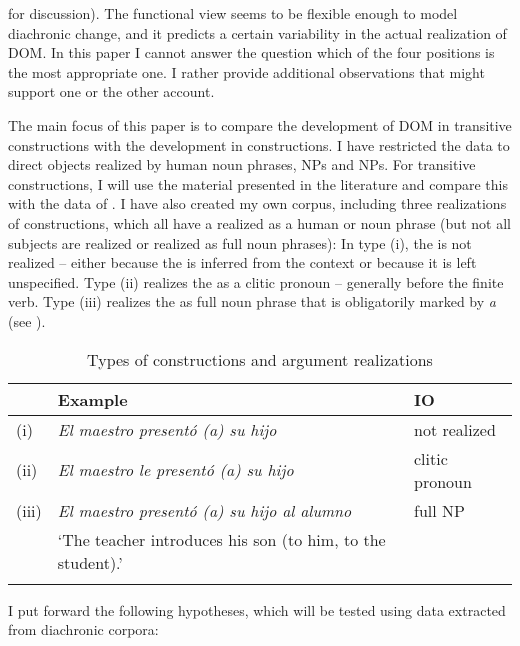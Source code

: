 \documentclass[output=paper]{LSP/langsci}
\begin{document}
\citealt{Aissen2003Differential} for discussion). The functional view seems to be flexible enough to model diachronic change, and it predicts a certain variability in the actual realization of DOM. In this paper I cannot answer the question which of the four positions is the most appropriate one. I rather provide additional observations that might support one or the other account.

The main focus of this paper is to compare the development of DOM in transitive constructions with the development in  constructions. I have restricted the data to direct objects realized by human noun phrases, \ie {} NPs and  NPs. For transitive constructions, I will use the material presented in the literature \citep{Melis1995Objetodirecto, Laca2006Objeto, vonHeusingeretal2007Differential,vonHeusingeretal2011Affectedness,vonHeusinger2008Verbal} and compare this with the data of \citet{Ortiz2005Objetos,Ortiz2011Construcciones}. I have also created my own corpus, including three realizations of  constructions, which all have a  realized as a human  or  noun phrase (but not all subjects are realized or realized as full noun phrases): In type (i), the  is not realized – either because the  is inferred from the context or because it is left unspecified. Type (ii) realizes the  as a clitic pronoun – generally before the finite verb. Type (iii) realizes the  as full noun phrase that is obligatorily marked by \textit{a} (see ).

\begin{table}
\caption{Types of constructions and argument realizations}\label{11-he-tab:1a}
\begin{tabularx}{\textwidth}{lQl}
\lsptoprule
& Example & IO\\
\midrule 
(i) & \emph{El maestro presentó (a) su hijo} & not realized\\
(ii) &\emph{El maestro le presentó (a) su hijo} & clitic pronoun\\
(iii) & \emph{El maestro presentó (a) su hijo al alumno} & full NP\\
& ‘The teacher introduces his son (to him, to the student).’ &\\
\lspbottomrule
\end{tabularx}
\end{table}

 
I put forward the following hypotheses, which will be tested using data extracted from diachronic corpora:
\end{document}
